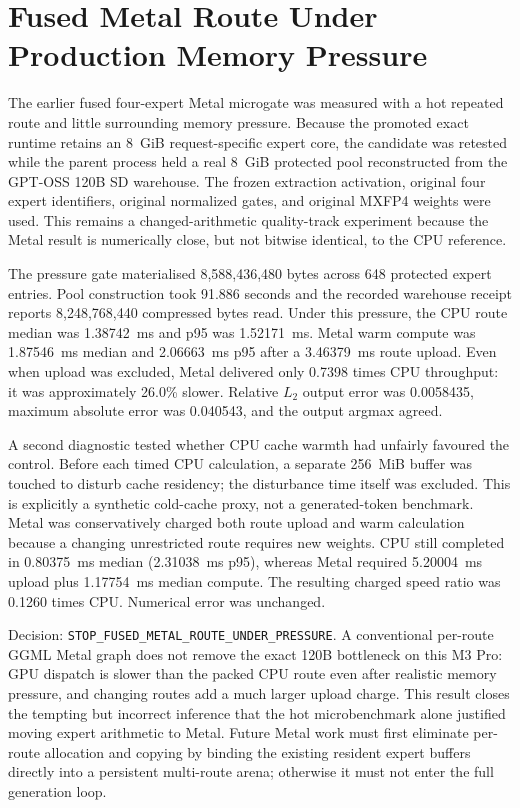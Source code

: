 \section{Fused Metal Route Under Production Memory Pressure}
\label{sec:gptoss120b-metal-pressure-20260911}

The earlier fused four-expert Metal microgate was measured with a hot repeated
route and little surrounding memory pressure.  Because the promoted exact
runtime retains an 8~GiB request-specific expert core, the candidate was
retested while the parent process held a real 8~GiB protected pool reconstructed
from the GPT-OSS 120B SD warehouse.  The frozen extraction activation, original
four expert identifiers, original normalized gates, and original MXFP4 weights
were used.  This remains a changed-arithmetic quality-track experiment because
the Metal result is numerically close, but not bitwise identical, to the CPU
reference.

The pressure gate materialised 8,588,436,480 bytes across 648 protected expert
entries.  Pool construction took 91.886 seconds and the recorded warehouse
receipt reports 8,248,768,440 compressed bytes read.  Under this pressure, the
CPU route median was 1.38742~ms and p95 was 1.52171~ms.  Metal warm compute was
1.87546~ms median and 2.06663~ms p95 after a 3.46379~ms route upload.  Even when
upload was excluded, Metal delivered only 0.7398 times CPU throughput: it was
approximately 26.0\% slower.  Relative $L_2$ output error was 0.0058435, maximum
absolute error was 0.040543, and the output argmax agreed.

A second diagnostic tested whether CPU cache warmth had unfairly favoured the
control.  Before each timed CPU calculation, a separate 256~MiB buffer was
touched to disturb cache residency; the disturbance time itself was excluded.
This is explicitly a synthetic cold-cache proxy, not a generated-token
benchmark.  Metal was conservatively charged both route upload and warm
calculation because a changing unrestricted route requires new weights.  CPU
still completed in 0.80375~ms median (2.31038~ms p95), whereas Metal required
5.20004~ms upload plus 1.17754~ms median compute.  The resulting charged speed
ratio was 0.1260 times CPU.  Numerical error was unchanged.

Decision: \texttt{STOP\_FUSED\_METAL\_ROUTE\_UNDER\_PRESSURE}.  A conventional
per-route GGML Metal graph does not remove the exact 120B bottleneck on this M3
Pro: GPU dispatch is slower than the packed CPU route even after realistic
memory pressure, and changing routes add a much larger upload charge.  This
result closes the tempting but incorrect inference that the hot microbenchmark
alone justified moving expert arithmetic to Metal.  Future Metal work must
first eliminate per-route allocation and copying by binding the existing
resident expert buffers directly into a persistent multi-route arena; otherwise
it must not enter the full generation loop.

